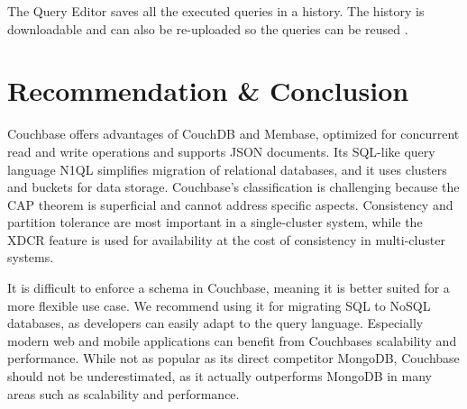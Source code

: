The Query Editor saves all the executed queries in a history. The history is downloadable and can also be re-uploaded so the queries can be reused \parencite{Couchbase.20230325}.


\section{Recommendation \& Conclusion}

Couchbase offers advantages of CouchDB and Membase, optimized for concurrent read and write operations and supports \ac{JSON} documents. Its \ac{SQL}-like query language \ac{N1QL} simplifies migration of relational databases, and it uses clusters and buckets for data storage. Couchbase's classification is challenging because the \ac{CAP} theorem is superficial and cannot address specific aspects. Consistency and partition tolerance are most important in a single-cluster system, while the \ac{XDCR} feature is used for availability at the cost of consistency in multi-cluster systems.

It is difficult to enforce a schema in Couchbase, meaning it is better suited for a more flexible use case. We recommend using it for migrating \ac{SQL} to \ac{NoSQL} databases, as developers can easily adapt to the query language. Especially modern web and mobile applications can benefit from Couchbases scalability and performance. While not as popular as its direct competitor MongoDB, Couchbase should not be underestimated, as it actually outperforms MongoDB in many areas such as scalability and performance.
